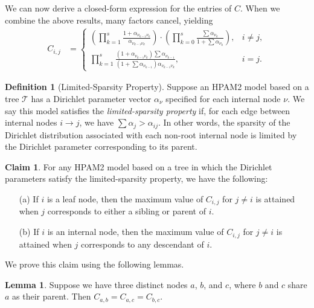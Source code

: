 \documentclass{article}
\theoremstyle{definition}
\newtheorem{lemma}[thm]{Lemma}
\newtheorem{claim}[thm]{Claim}
\newtheorem{defn}[thm]{Definition}
\begin{document}
We can now derive a closed-form expression for the entries of $C$.
When we combine the above results, many factors cancel, yielding
\begin{align}
C_{i,j}
&=
\begin{cases}
\left(
  \prod_{k=1}^s
  \frac { 1 + \alpha_{\nu_{k-1} \nu_k} } { \alpha_{\nu_{k-1} \nu_k} }
\right)
\cdot
\left(
  \prod_{k=0}^s
  \frac { \sum \alpha_{\nu_k} } { 1 + \sum \alpha_{\nu_k} }
\right),
& i \neq j, \\
\prod_{k=1}^s \frac
  { \left( 1 + \alpha_{\nu_{k-1} \nu_k} \right) \sum \alpha_{\nu_{k-1}} }
  { \left( 1 + \sum \alpha_{\nu_{k-1}} \right) \alpha_{\nu_{k-1} \nu_k} },
& i = j.
\end{cases}
\label{eqn:closedFormC}
\end{align}

\begin{defn}[Limited-Sparsity Property]
Suppose an HPAM2 model based on a tree $\mathcal T$ has a Dirichlet parameter vector $\alpha_\nu$ specified for each internal node $\nu$.
We say this model satisfies the \emph{limited-sparsity property} if, for each edge between internal nodes $i \to j$, we have $\sum \alpha_j > \alpha_{ij}$.
In other words, the sparsity of the Dirichlet distribution associated with each non-root internal node is limited by the Dirichlet parameter corresponding to its parent.
\end{defn}

\begin{claim}
For any HPAM2 model based on a tree in which the Dirichlet parameters satisfy the limited-sparsity property, we have the following:
\begin{itemize}
  \item[(a)] If $i$ is a leaf node, then the maximum value of $C_{i,j}$ for $j \neq i$ is attained when $j$ corresponds to either a sibling or parent of $i$.
  \item[(b)] If $i$ is an internal node, then the maximum value of $C_{i,j}$ for $j \neq i$ is attained when $j$ corresponds to any descendant of $i$.
\end{itemize}
\label{claim:CMatrixProperty}
\end{claim}

We prove this claim using the following lemmas.

\begin{lemma}
Suppose we have three distinct nodes $a$, $b$, and $c$, where $b$ and $c$ share $a$ as their parent.
Then $C_{a,b} = C_{a,c} = C_{b,c}$.
\label{lemma:equalSharedParent}
\end{lemma}
\end{document}
